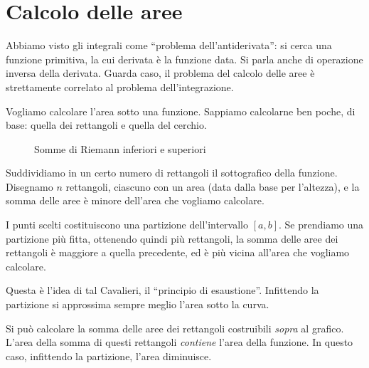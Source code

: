 \section{Calcolo delle aree}

Abbiamo visto gli integrali come ``problema dell'antiderivata'': si cerca una funzione primitiva, la cui derivata \`e la funzione data. Si parla anche di operazione inversa della derivata. Guarda caso, il problema del calcolo delle aree \`e strettamente correlato al problema dell'integrazione.

Vogliamo calcolare l'area sotto una funzione. Sappiamo calcolarne ben poche, di base: quella dei rettangoli e quella del cerchio.

\begin{figure}[h]
\centering
{}
\caption{Somme di Riemann inferiori e superiori}
\end{figure}

Suddividiamo in un certo numero di rettangoli il sottografico della funzione. Disegnamo $n$ rettangoli, ciascuno con un area (data dalla base per l'altezza), e la somma delle aree \`e minore dell'area che vogliamo calcolare.

I punti scelti costituiscono una partizione dell'intervallo $[a,b]$. Se prendiamo una partizione pi\`u fitta, ottenendo quindi pi\`u rettangoli, la somma delle aree dei rettangoli \`e maggiore a quella precedente, ed \`e pi\`u vicina all'area che vogliamo calcolare.

Questa \`e l'idea di tal Cavalieri, il ``principio di esaustione''. Infittendo la partizione si approssima sempre meglio l'area sotto la curva.

Si pu\`o calcolare la somma delle aree dei rettangoli costruibili \emph{sopra} al grafico. L'area della somma di questi rettangoli \emph{contiene} l'area della funzione. In questo caso, infittendo la partizione, l'area diminuisce.

